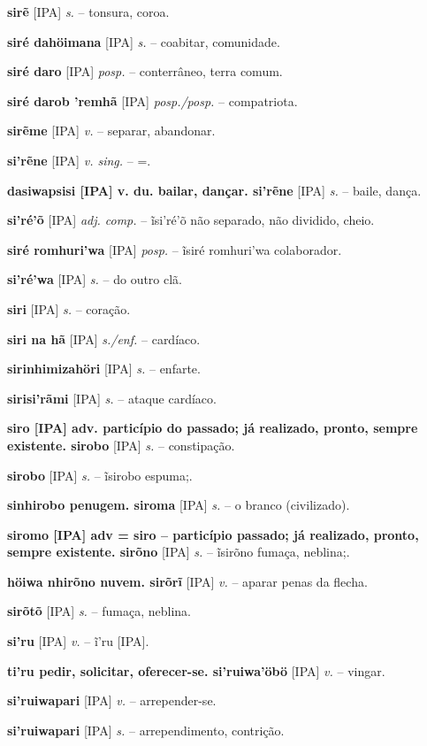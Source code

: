 \textbf{sirẽ} [IPA] \textit{s.} -- tonsura, coroa.

\textbf{siré dahöimana} [IPA] \textit{s.} -- coabitar, comunidade.

\textbf{siré daro} [IPA] \textit{posp.} -- conterrâneo, terra comum.

\textbf{siré darob 'remhã} [IPA] \textit{posp./posp.} -- compatriota.

\textbf{sirẽme} [IPA] \textit{v.} -- separar, abandonar.

\textbf{si'rẽne} [IPA] \textit{v. sing.} -- =.

\textbf{dasiwapsisi [IPA] v. du. bailar, dançar. si'rẽne} [IPA] \textit{s.} -- baile, dança.

\textbf{si'ré'õ} [IPA] \textit{adj. comp.} -- ĩsi'ré'õ não separado, não dividido, cheio.

\textbf{siré romhuri'wa} [IPA] \textit{posp.} -- ĩsiré romhuri'wa colaborador.

\textbf{si'ré'wa} [IPA] \textit{s.} -- do outro clã.

\textbf{siri} [IPA] \textit{s.} -- coração.

\textbf{siri na hã} [IPA] \textit{s./enf.} -- cardíaco.

\textbf{sirinhimizahöri} [IPA] \textit{s.} -- enfarte.

\textbf{sirisi'rãmi} [IPA] \textit{s.} -- ataque cardíaco.

\textbf{siro [IPA] adv. particípio do passado; já realizado, pronto, sempre existente. sirobo} [IPA] \textit{s.} -- constipação.

\textbf{sirobo} [IPA] \textit{s.} -- ĩsirobo espuma;.

\textbf{sinhirobo penugem. siroma} [IPA] \textit{s.} -- o branco (civilizado).

\textbf{siromo [IPA] adv = siro -- particípio passado; já realizado, pronto, sempre existente. sirõno} [IPA] \textit{s.} -- ĩsirõno fumaça, neblina;.

\textbf{höiwa nhirõno nuvem. sirõrĩ} [IPA] \textit{v.} -- aparar penas da flecha.

\textbf{sirõtõ} [IPA] \textit{s.} -- fumaça, neblina.

\textbf{si'ru} [IPA] \textit{v.} -- ĩ'ru [IPA].

\textbf{ti'ru pedir, solicitar, oferecer-se. si'ruiwa'öbö} [IPA] \textit{v.} -- vingar.

\textbf{si'ruiwapari} [IPA] \textit{v.} -- arrepender-se.

\textbf{si'ruiwapari} [IPA] \textit{s.} -- arrependimento, contrição.

